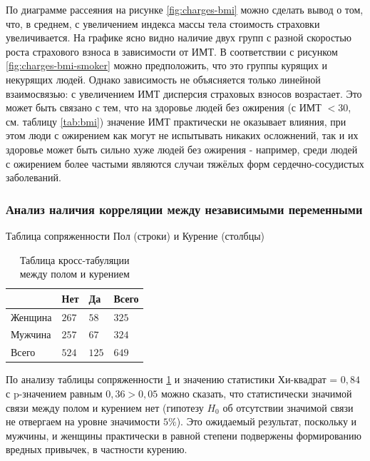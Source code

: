\documentclass[a4paper,12pt]{article}
\begin{document}
По диаграмме рассеяния на рисунке \ref{fig:charges-bmi} можно сделать вывод о том, что, в среднем, с увеличением индекса массы тела стоимость страховки увеличивается. На графике ясно видно наличие двух групп с разной скоростью роста страхового взноса в зависимости от ИМТ. В соответствии с рисунком \ref{fig:charges-bmi-smoker} можно предположить, что это группы курящих и некурящих людей. Однако зависимость не объясняется только линейной взаимосвязью: с увеличением ИМТ дисперсия страховых взносов возрастает. Это может быть связано с тем, что на здоровье людей без ожирения (с ИМТ $<30$, см. таблицу \ref{tab:bmi}) значение ИМТ практически не оказывает влияния, при этом люди с ожирением как могут не испытывать никаких осложнений, так и их здоровье может быть сильно хуже людей без ожирения - например, среди людей с ожирением более частыми являются случаи тяжёлых форм сердечно-сосудистых заболеваний.

\subsubsection{Анализ наличия корреляции между независимыми переменными}

\begin{table}[H]
	\begin{center}
		Таблица сопряженности Пол (строки) и Курение (столбцы)\\
		
		\vspace{8pt}
		
		\begin{tabular}{|l|l|l|l|}
			\hline
		    & Нет & Да & Всего \\[1ex]
		    \hline
			Женщина & $267$ & $58$ & $325$\\
			\hline
			Мужчина & $257$ & $67$ & $324$\\[1ex]
			\hline
			Всего & $524$ & $125$ & $649$\\
			\hline
		\end{tabular}
		\caption{Таблица кросс-табуляции между полом и курением}
		\label{tab:cross}
	\end{center}
\end{table}

По анализу таблицы сопряженности \ref{tab:cross} и значению статистики Хи-квадрат = $0,84$ с p-значением равным $0,36 > 0,05$ можно сказать, что статистически значимой связи между полом и курением нет (гипотезу $H_0$ об отсутствии значимой связи не отвергаем на уровне значимости $5\%$). Это ожидаемый результат, поскольку и мужчины, и женщины практически в равной степени подвержены формированию вредных привычек, в частности курению.
\end{document}
